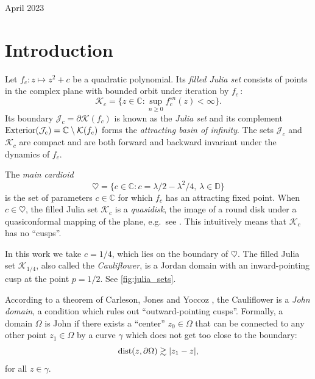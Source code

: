 \begin{onehalfspace}
\begin{center}
April 2023
\par\end{center}
\end{onehalfspace}





\section{Introduction}

% 

Let $f_c: z\mapsto z^2 + c$ be a quadratic polynomial. Its {\em filled Julia set} consists of points in the complex plane with bounded orbit
under iteration by $f_c$\,:
$$
\mathcal K_c = \bigl \{z \in \mathbb{C} : \sup_{n \ge 0} f_c^{\circ n}(z) < \infty \bigr \}.
$$
Its boundary $\mathcal J_c = \partial \mathcal K(f_c)$ is known as the {\em Julia set}\/ and its complement $\operatorname{Exterior}(\mathcal{J}_c) = \mathbb{C} \setminus \mathcal K(f_c)$ forms the {\em attracting basin of infinity}. The sets $\mathcal J_c$ and $\mathcal K_c$ are compact and are both forward and backward invariant under the dynamics of $f_c$.
 
The {\em main cardioid}
$$
\heartsuit = \bigl  \{c \in \mathbb{C}: c = \lambda/2 - \lambda^2/4,\, \lambda \in \mathbb{D} \bigr \}
$$
is the set of parameters $c \in \mathbb{C}$ for which $f_c$ has an attracting fixed point.
When $c \in \heartsuit$, the filled Julia set $\mathcal K_c$ is a \emph{quasidisk}\/, the image of a round disk under a quasiconformal mapping of the plane, e.g.~see \cite[Theorem VI.2.1]{gamelin2003complex}.
This intuitively means that $\mathcal K_c$ has no \enquote{cusps}.


In this work we take $c=1/4$, which lies on the boundary of $\heartsuit$. 
The filled Julia set $\mathcal K_{1/4}$, also called the \emph{Cauliflower}, 
is a Jordan domain with an inward-pointing cusp at the point $p=1/2$. See \cref{fig:julia_sets}.

According to a theorem of Carleson, Jones and Yoccoz \cite[Theorem 6.1]{carleson_julia_1994}, 
the Cauliflower is a \emph{John domain}\/, a condition which rules out \enquote{outward-pointing cusps}. 
Formally, a domain $\Omega$ is John if there exists a \enquote{center} 
$z_0 \in \Omega$ that can be connected 
to any other point $z_1\in \Omega$ by a curve $\gamma$ which does not get too close to the boundary:
\begin{equation}
	\operatorname{dist}(z, \partial \Omega) \gtrsim |z_1-z|,
\end{equation} for all $z\in \gamma$.

